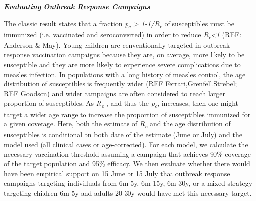 \emph{\textbf{Evaluating Outbreak Response Campaigns}}

The classic result states that a fraction \emph{p\textsubscript{c}
\textgreater{} 1-1/R\textsubscript{e }}of susceptibles must be immunized
(i.e. vaccinated and seroconverted) in order to reduce
\emph{R\textsubscript{e}\textless{}1} (REF: Anderson \& May). Young
children are conventionally targeted in outbreak response vaccination
campaigns because they are, on average, more likely to be susceptible
and they are more likely to experience severe complications due to
measles infection. In populations with a long history of measles
control, the age distribution of susceptibles is frequently wider (REF
Ferrari,Grenfell,Strebel; REF Goodson) and wider campaigns are often
considered to reach larger proportion of susceptibles. As
\emph{R\textsubscript{e}} , and thus the \emph{p\textsubscript{c}},
increases, then one might target a wider age range to increase the
proportion of susceptibles immunized for a given coverage. Here, both
the estimate of \emph{R\textsubscript{e}} and the age distribution of
susceptibles is conditional on both date of the estimate (June or July)
and the model used (all clinical cases or age-corrected). For each
model, we calculate the necessary vaccination threshold assuming a
campaign that achieves 90\% coverage of the target population and 95\%
efficacy. We then evaluate whether there would have been empirical
support on 15 June or 15 July that outbreak response campaigns targeting
individuals from 6m-5y, 6m-15y, 6m-30y, or a mixed strategy targeting
children 6m-5y and adults 20-30y would have met this necessary target.